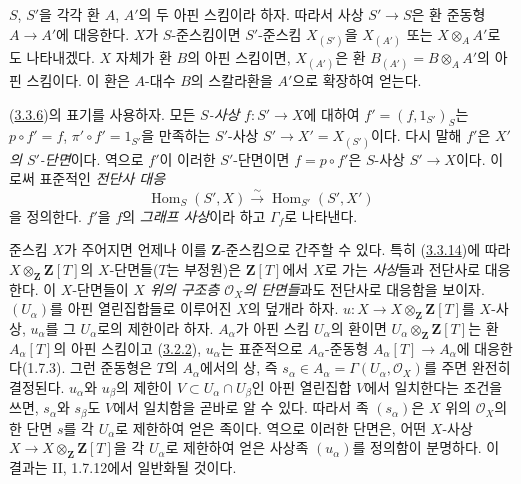 \begin{env}[3.3.13]
\label{I.3.3.13-ko}
$S$, $S'$을 각각 환 $A$, $A'$의 두 아핀 스킴이라 하자. 따라서
사상 $S'\to S$은 환 준동형 $A\to A'$에 대응한다. $X$가
$S$-준스킴이면 $S'$-준스킴 $X_{(S')}$을
$X_{(A')}$ 또는 $X\otimes_A A'$로도 나타내겠다. $X$ 자체가 환
$B$의 아핀 스킴이면, $X_{(A')}$은 환
$B_{(A')}=B\otimes_A A'$의 아핀 스킴이다. 이 환은
$A$-대수 $B$의 스칼라환을 $A'$으로 확장하여 얻는다.
\end{env}

\begin{env}[3.3.14]
\label{I.3.3.14-ko}
(\hyperref[I.3.3.6-ko]{3.3.6})의 표기를 사용하자. 모든
\emph{$S$-사상} $f:S'\to X$에 대하여
$f'=(f,1_{S'})_S$는 $p\circ f'=f$, $\pi'\circ f'=1_{S'}$을
만족하는 $S'$-사상 $S'\to X'=X_{(S')}$이다. 다시 말해 $f'$은
\emph{$X'$의 $S'$-단면}이다. 역으로 $f'$이 이러한 $S'$-단면이면
$f=p\circ f'$은 $S$-사상 $S'\to X$이다. 이로써 표준적인
\emph{전단사 대응}
\label{I.3.3.14.correspondence-ko}
\[
  \operatorname{Hom}_S(S',X)\overset{\sim}{\longrightarrow}
  \operatorname{Hom}_{S'}(S',X')
\]
을 정의한다. $f'$을 $f$의 \emph{그래프 사상}이라 하고
$\Gamma_f$로 나타낸다.
\end{env}

\begin{env}[3.3.15]
\label{I.3.3.15-ko}
준스킴 $X$가 주어지면 언제나 이를 $\mathbf Z$-준스킴으로 간주할
수 있다. 특히 (\hyperref[I.3.3.14-ko]{3.3.14})에 따라
$X\otimes_{\mathbf Z}\mathbf Z[T]$의 $X$-단면들($T$는
부정원)은 $\mathbf Z[T]$에서 $X$로 가는 \emph{사상}들과
전단사로 대응한다. 이 $X$-단면들이
\emph{$X$ 위의 구조층 $\mathcal O_X$의 단면들}과도 전단사로
대응함을 보이자. $(U_\alpha)$를 아핀 열린집합들로 이루어진 $X$의
덮개라 하자. $u:X\to X\otimes_{\mathbf Z}\mathbf Z[T]$를
$X$-사상, $u_\alpha$를 그 $U_\alpha$로의 제한이라 하자.
$A_\alpha$가 아핀 스킴 $U_\alpha$의 환이면
$U_\alpha\otimes_{\mathbf Z}\mathbf Z[T]$는 환
$A_\alpha[T]$의 아핀 스킴이고
(\hyperref[I.3.2.2-ko]{3.2.2}), $u_\alpha$는 표준적으로
$A_\alpha$-준동형 $A_\alpha[T]\to A_\alpha$에 대응한다(1.7.3).
그런 준동형은 $T$의 $A_\alpha$에서의 상, 즉
$s_\alpha\in A_\alpha=\Gamma(U_\alpha,\mathcal O_X)$를 주면
완전히 결정된다. $u_\alpha$와 $u_\beta$의 제한이
$V\subset U_\alpha\cap U_\beta$인 아핀 열린집합 $V$에서
일치한다는 조건을 쓰면, $s_\alpha$와 $s_\beta$도 $V$에서
일치함을 곧바로 알 수 있다. 따라서 족 $(s_\alpha)$은
$X$ 위의 $\mathcal O_X$의 한 단면 $s$를 각 $U_\alpha$로 제한하여
얻은 족이다. 역으로 이러한 단면은, 어떤 $X$-사상
$X\to X\otimes_{\mathbf Z}\mathbf Z[T]$을 각 $U_\alpha$로
제한하여 얻은 사상족 $(u_\alpha)$를 정의함이 분명하다. 이 결과는
II, 1.7.12에서 일반화될 것이다.
\end{env}

